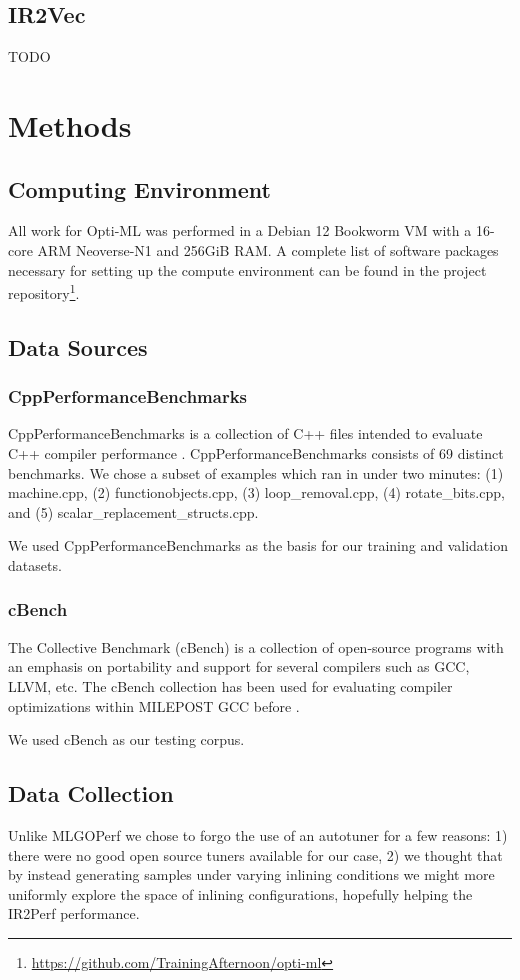 \documentclass[nohyperref]{article}
\theoremstyle{plain}
\theoremstyle{definition}
\theoremstyle{remark}
\begin{document}
\subsection{IR2Vec}
TODO

\section{Methods}
\label{methods}
\subsection{Computing Environment}
All work for Opti-ML was performed in a Debian 12 Bookworm VM with a 16-core ARM Neoverse-N1 and 256GiB RAM. A complete list of software packages necessary for setting up the compute environment can be found in the project repository\footnote{\href{https://github.com/TrainingAfternoon/opti-ml}{https://github.com/TrainingAfternoon/opti-ml}}.

\subsection{Data Sources}
\subsubsection{CppPerformanceBenchmarks}
CppPerformanceBenchmarks is a collection of C++ files intended to evaluate C++ compiler performance \cite{cpp-perf-benchmarks}. CppPerformanceBenchmarks consists of 69 distinct benchmarks. We chose a subset of examples which ran in under two minutes: (1) machine.cpp, (2) functionobjects.cpp, (3) loop\_removal.cpp, (4) rotate\_bits.cpp, and (5) scalar\_replacement\_structs.cpp.

We used CppPerformanceBenchmarks as the basis for our training and validation datasets.

\subsubsection{cBench}
The Collective Benchmark (cBench) is a collection of open-source programs with an emphasis on portability and support for several compilers such as GCC, LLVM, etc. The cBench collection has been used for evaluating compiler optimizations within MILEPOST GCC before \cite{cbench}.

We used cBench as our testing corpus.

\subsection{Data Collection}
Unlike MLGOPerf we chose to forgo the use of an autotuner for a few reasons: 1) there were no good open source tuners available for our case, 2) we thought that by instead generating samples under varying inlining conditions we might more uniformly explore the space of inlining configurations, hopefully helping the IR2Perf performance.
\end{document}
